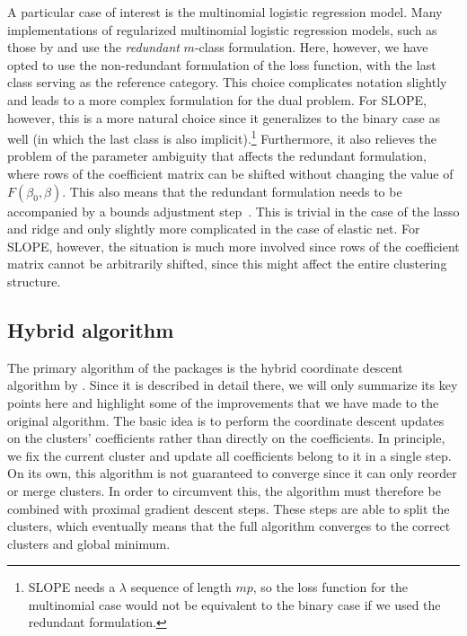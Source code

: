 \documentclass[article]{jss}
\begin{document}
A particular case of interest is the multinomial logistic regression model.
Many implementations of regularized multinomial logistic regression models, such
as those by \citet{friedman2010} and \citet{fercoq2015} use the \emph{redundant}
\(m\)-class formulation. Here, however, we have opted to use the non-redundant
formulation of the loss function, with the last class serving as the reference
category. This choice complicates notation slightly and leads to a more
complex formulation for the dual problem. For SLOPE, however, this is a
more natural choice since it generalizes to the binary case as well (in which
the last class is also implicit).\footnote{SLOPE needs a \(\lambda\) sequence of length
  \(mp\), so the loss function for the multinomial case would not be equivalent
  to the binary case if we used the redundant formulation.} Furthermore, it also
relieves the problem of the parameter ambiguity that affects the redundant
formulation, where rows of the coefficient matrix can be shifted
without changing the value of \(F(\beta_0, \beta)\). This also means that
the redundant formulation needs to be accompanied by a bounds adjustment step~\citep{friedman2010}.
This is trivial in the case of the lasso and ridge and
only slightly more complicated in the case of elastic net. For SLOPE, however,
the situation is much more involved since rows of the coefficient matrix cannot
be arbitrarily shifted, since this might affect the entire clustering
structure.

\subsection{Hybrid algorithm}

The primary algorithm of the  packages is the hybrid coordinate
descent algorithm by \citet{larsson2023}. Since it is described in detail
there, we will only summarize its key points here and highlight
some of the improvements that we have made to the original algorithm.
The basic idea is to perform the coordinate descent updates on
the clusters' coefficients rather than directly on the coefficients. In principle,
we fix the current cluster and update all coefficients belong to it in a single step.
On its own, this algorithm is not guaranteed to converge since it can only
reorder or merge clusters. In order to circumvent this, the algorithm must
therefore be combined with proximal gradient descent steps. These steps
are able to split the clusters, which eventually means that the full
algorithm converges to the correct clusters and global minimum.
\end{document}
